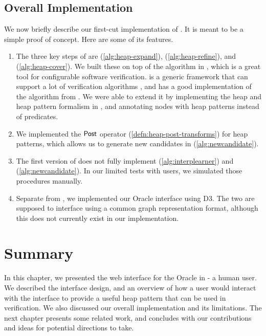 \subsection{Overall Implementation}
We now briefly describe our first-cut implementation of \verifier. It is meant to be
a simple proof of concept. Here are some of its features.

\begin{enumerate}
  \item The three key steps of \verifier are \expandp (\autoref{alg:heap-expand}),  (\autoref{alg:heap-refine}), and \coverp (\autoref{alg:heap-cover}). We built these on top of the \impact algorithm in \cpachecker, which is a great tool for configurable software verification. \cpachecker is a generic framework that can support a lot of verification algorithms \cite{cpachecker}, and has a good implementation of the \impact algorithm from \cite{mcmillan06}. We were able to extend it by implementing the heap and heap pattern formalism in \cpachecker, and annotating nodes with heap patterns instead of predicates.
  \item We implemented the $\mathsf{Post}$ operator (\autoref{defn:heap-post-transforms}) for heap patterns, which allows us to generate new candidates in \newcandidate (\autoref{alg:newcandidate}).
  \item The first version of \verifier does not fully implement \seplearner (\autoref{alg:interplearner}) and \newcandidate (\autoref{alg:newcandidate}). In our limited tests with users, we simulated those procedures manually.
  \item Separate from \cpachecker, we implemented our Oracle interface using D3. The two are supposed to interface using a common graph representation format, although this does not currently exist in our implementation.
\end{enumerate}

\section*{Summary}
In this chapter, we presented the web interface for the Oracle in \verifier - a human
user. We described the interface design, and an overview of how a user would interact
with the interface to provide a useful heap pattern that can be used in verification. We
also discussed our overall implementation and its limitations. The next chapter presents
some related work, and concludes with  our contributions and ideas for potential
directions to take.
